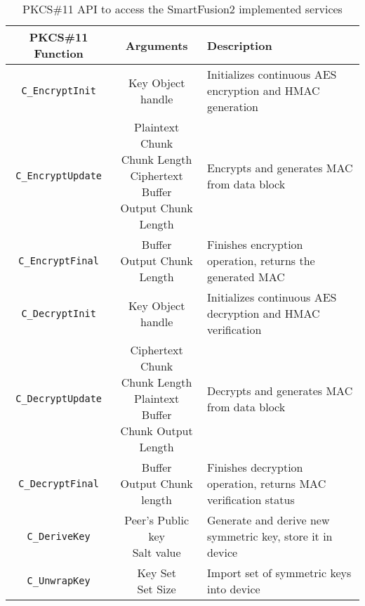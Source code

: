 \begin{table}[]
\centering
\def\arraystretch{1.5}
	\begin{tabular}{|c|c|l|}
	\hline
	\textbf{PKCS\#11 Function} & \textbf{Arguments} & \textbf{Description} \\ \hline
	\texttt{C\_EncryptInit}		& Key Object handle & Initializes continuous AES encryption and HMAC generation \\ \hline
	\texttt{C\_EncryptUpdate}	& \makecell{Plaintext Chunk\\Chunk Length\\Ciphertext Buffer\\Output Chunk Length} & Encrypts and generates MAC from data block \\ \hline
	\texttt{C\_EncryptFinal}	& \makecell{Buffer\\Output Chunk Length} & Finishes encryption operation, returns the generated MAC\\ \hline
	\texttt{C\_DecryptInit}		& Key Object handle & Initializes continuous AES decryption and HMAC verification\\ \hline
	\texttt{C\_DecryptUpdate}	& \makecell{Ciphertext Chunk\\Chunk Length\\Plaintext Buffer\\Chunk Output Length} & Decrypts and generates MAC from data block\\ \hline
	\texttt{C\_DecryptFinal}	& \makecell{Buffer\\Output Chunk length} & Finishes decryption operation, returns MAC verification status\\ \hline
	\texttt{C\_DeriveKey}		& \makecell{Peer's Public key\\Salt value} & Generate and derive new symmetric key, store it in device \\ \hline
	\texttt{C\_UnwrapKey}		& \makecell{Key Set\\Set Size} & Import set of symmetric keys into device\\ \hline
\end{tabular}
\caption{PKCS\#11 API to access the SmartFusion2 implemented services}
\label{tab:pkcs11-api}
\end{table}
